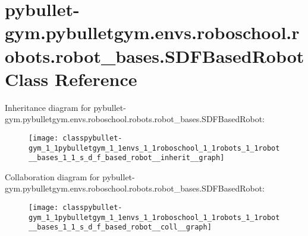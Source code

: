 \hypertarget{classpybullet-gym_1_1pybulletgym_1_1envs_1_1roboschool_1_1robots_1_1robot__bases_1_1_s_d_f_based_robot}{}\section{pybullet-\/gym.pybulletgym.\+envs.\+roboschool.\+robots.\+robot\+\_\+bases.\+S\+D\+F\+Based\+Robot Class Reference}
\label{classpybullet-gym_1_1pybulletgym_1_1envs_1_1roboschool_1_1robots_1_1robot__bases_1_1_s_d_f_based_robot}


Inheritance diagram for pybullet-\/gym.pybulletgym.\+envs.\+roboschool.\+robots.\+robot\+\_\+bases.\+S\+D\+F\+Based\+Robot\+:
\nopagebreak
\begin{figure}[H]
\begin{center}
\leavevmode
\texttt{[image: classpybullet-gym\_1\_1pybulletgym\_1\_1envs\_1\_1roboschool\_1\_1robots\_1\_1robot\_\_bases\_1\_1\_s\_d\_f\_based\_robot\_\_inherit\_\_graph]}
\end{center}
\end{figure}


Collaboration diagram for pybullet-\/gym.pybulletgym.\+envs.\+roboschool.\+robots.\+robot\+\_\+bases.\+S\+D\+F\+Based\+Robot\+:
\nopagebreak
\begin{figure}[H]
\begin{center}
\leavevmode
\texttt{[image: classpybullet-gym\_1\_1pybulletgym\_1\_1envs\_1\_1roboschool\_1\_1robots\_1\_1robot\_\_bases\_1\_1\_s\_d\_f\_based\_robot\_\_coll\_\_graph]}
\end{center}
\end{figure}
